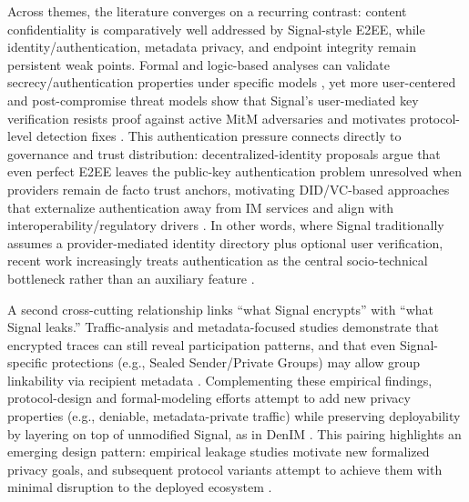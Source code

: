 Across themes, the literature converges on a recurring contrast: content confidentiality is comparatively well addressed by Signal-style E2EE, while identity/authentication, metadata privacy, and endpoint integrity remain persistent weak points. Formal and logic-based analyses can validate secrecy/authentication properties under specific models \cite{kamkuemah2021}, yet more user-centered and post-compromise threat models show that Signal’s user-mediated key verification resists proof against active MitM adversaries and motivates protocol-level detection fixes \cite{dowling2021}. This authentication pressure connects directly to governance and trust distribution: decentralized-identity proposals argue that even perfect E2EE leaves the public-key authentication problem unresolved when providers remain de facto trust anchors, motivating DID/VC-based approaches that externalize authentication away from IM services and align with interoperability/regulatory drivers \cite{morales2024}. In other words, where Signal traditionally assumes a provider-mediated identity directory plus optional user verification, recent work increasingly treats authentication as the central socio-technical bottleneck rather than an auxiliary feature \cite{dowling2021,morales2024}.

A second cross-cutting relationship links “what Signal encrypts” with “what Signal leaks.” Traffic-analysis and metadata-focused studies demonstrate that encrypted traces can still reveal participation patterns, and that even Signal-specific protections (e.g., Sealed Sender/Private Groups) may allow group linkability via recipient metadata \cite{bozorgi2023,brigham2025}. Complementing these empirical findings, protocol-design and formal-modeling efforts attempt to add new privacy properties (e.g., deniable, metadata-private traffic) while preserving deployability by layering on top of unmodified Signal, as in DenIM \cite{nelson2024}. This pairing highlights an emerging design pattern: empirical leakage studies motivate new formalized privacy goals, and subsequent protocol variants attempt to achieve them with minimal disruption to the deployed ecosystem \cite{bozorgi2023,nelson2024,brigham2025}.

